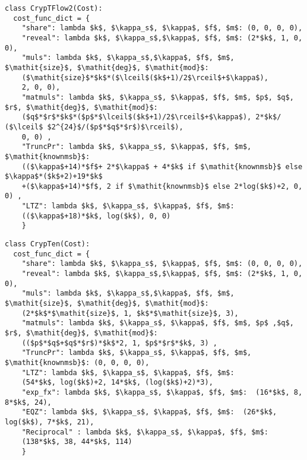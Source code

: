 \begin{lstlisting}[mathescape,xleftmargin=2em,framexleftmargin=2em, caption = {Communication cost configuration for basic operations of $\texttt{CrypTFlow2}$~\cite{rathee2020cryptflow2}.}, columns=fullflexible, label = {list:cryptflow2_cost}]
class CrypTFlow2(Cost):
  cost_func_dict = {
    "share": lambda $k$, $\kappa_s$, $\kappa$, $f$, $m$: (0, 0, 0, 0),
    "reveal": lambda $k$, $\kappa_s$,$\kappa$, $f$, $m$: (2*$k$, 1, 0, 0),
    "muls": lambda $k$, $\kappa_s$,$\kappa$, $f$, $m$, $\mathit{size}$, $\mathit{deg}$, $\mathit{mod}$: 
    ($\mathit{size}$*$k$*($\lceil$($k$+1)/2$\rceil$+$\kappa$), 
    2, 0, 0),
    "matmuls": lambda $k$, $\kappa_s$, $\kappa$, $f$, $m$, $p$, $q$, $r$, $\mathit{deg}$, $\mathit{mod}$: 
    ($q$*$r$*$k$*($p$*$\lceil$($k$+1)/2$\rceil$+$\kappa$), 2*$k$/ ($\lceil$ $2^{24}$/($p$*$q$*$r$)$\rceil$),
    0, 0) ,
    "TruncPr": lambda $k$, $\kappa_s$, $\kappa$, $f$, $m$, $\mathit{knownmsb}$: 
    (($\kappa$+14)*$f$+ 2*$\kappa$ + 4*$k$ if $\mathit{knownmsb}$ else $\kappa$*($k$+2)+19*$k$
    +($\kappa$+14)*$f$, 2 if $\mathit{knownmsb}$ else 2*log($k$)+2, 0, 0) ,    
    "LTZ": lambda $k$, $\kappa_s$, $\kappa$, $f$, $m$:  
    (($\kappa$+18)*$k$, log($k$), 0, 0) 
    }
\end{lstlisting}


\begin{lstlisting}[mathescape,xleftmargin=2em,framexleftmargin=2em, caption = {Communication cost configuration for basic operations of $\texttt{CrypTen}$~\cite{crypten2020}.}, columns=fullflexible, label = {list:crypten_cost}]
class CrypTen(Cost):
  cost_func_dict = {
    "share": lambda $k$, $\kappa_s$, $\kappa$, $f$, $m$: (0, 0, 0, 0),
    "reveal": lambda $k$, $\kappa_s$,$\kappa$, $f$, $m$: (2*$k$, 1, 0, 0),
    "muls": lambda $k$, $\kappa_s$,$\kappa$, $f$, $m$, $\mathit{size}$, $\mathit{deg}$, $\mathit{mod}$: 
    (2*$k$*$\mathit{size}$, 1, $k$*$\mathit{size}$, 3),
    "matmuls": lambda $k$, $\kappa_s$, $\kappa$, $f$, $m$, $p$ ,$q$, $r$, $\mathit{deg}$, $\mathit{mod}$: 
    (($p$*$q$+$q$*$r$)*$k$*2, 1, $p$*$r$*$k$, 3) ,
    "TruncPr": lambda $k$, $\kappa_s$, $\kappa$, $f$, $m$, $\mathit{knownmsb}$: (0, 0, 0, 0),    
    "LTZ": lambda $k$, $\kappa_s$, $\kappa$, $f$, $m$:  
    (54*$k$, log($k$)+2, 14*$k$, (log($k$)+2)*3), 
    "exp_fx": lambda $k$, $\kappa_s$, $\kappa$, $f$, $m$:  (16*$k$, 8, 8*$k$, 24), 
    "EQZ": lambda $k$, $\kappa_s$, $\kappa$, $f$, $m$:  (26*$k$, log($k$), 7*$k$, 21), 
    "Reciprocal" : lambda $k$, $\kappa_s$, $\kappa$, $f$, $m$:  
    (138*$k$, 38, 44*$k$, 114)
    }
\end{lstlisting}

